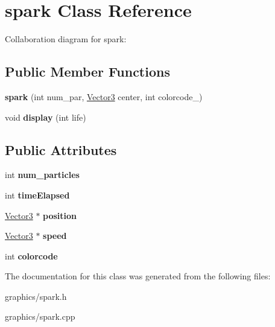 \hypertarget{classspark}{\section{spark Class Reference}
\label{classspark}
}


Collaboration diagram for spark\+:
\subsection*{Public Member Functions}
\begin{DoxyCompactItemize}
\item 
\hypertarget{classspark_ab8207d6d27413abd50796de468212a49}{{\bfseries spark} (int num\+\_\+par, \hyperlink{class_vector3}{Vector3} center, int colorcode\+\_\+)}\label{classspark_ab8207d6d27413abd50796de468212a49}

\item 
\hypertarget{classspark_a86b41f1cbef6c5e9e19f91786f084861}{void {\bfseries display} (int life)}\label{classspark_a86b41f1cbef6c5e9e19f91786f084861}

\end{DoxyCompactItemize}
\subsection*{Public Attributes}
\begin{DoxyCompactItemize}
\item 
\hypertarget{classspark_a32b97675c75218dad0dd90a686bba7d0}{int {\bfseries num\+\_\+particles}}\label{classspark_a32b97675c75218dad0dd90a686bba7d0}

\item 
\hypertarget{classspark_a1d886c70b5423cdfedfac54abc9a153c}{int {\bfseries time\+Elapsed}}\label{classspark_a1d886c70b5423cdfedfac54abc9a153c}

\item 
\hypertarget{classspark_a15b9105476785c6ea09a505c8a9345e7}{\hyperlink{class_vector3}{Vector3} $\ast$ {\bfseries position}}\label{classspark_a15b9105476785c6ea09a505c8a9345e7}

\item 
\hypertarget{classspark_a3b34af48c4c0320e1625dc404e5733e6}{\hyperlink{class_vector3}{Vector3} $\ast$ {\bfseries speed}}\label{classspark_a3b34af48c4c0320e1625dc404e5733e6}

\item 
\hypertarget{classspark_a328c1d54d6a737cbda28892f5e01e785}{int {\bfseries colorcode}}\label{classspark_a328c1d54d6a737cbda28892f5e01e785}

\end{DoxyCompactItemize}


The documentation for this class was generated from the following files\+:\begin{DoxyCompactItemize}
\item 
graphics/spark.\+h\item 
graphics/spark.\+cpp\end{DoxyCompactItemize}
